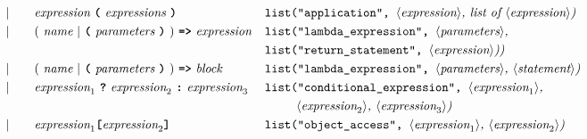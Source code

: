\begin{alignat*}{9}
&&                       && |   &\quad &&   \textit{expression} \ 
                                            \textbf{\texttt{(}}\ \textit{expressions}\
                                            \textbf{\texttt{)}}
                                                           && \texttt{list("application",  } \langle \textit{expression}\rangle \textit{, list of  } \langle \textit{expression}\rangle \textit{)} \\
&&                       && |   &\quad &&   (\ \textit{name}\ | \
                                               \textbf{\texttt{(}}\ \textit{parameters}\ \textbf{\texttt{)}}\
                                            )\    
                                            \texttt{\textbf{=>}}\ \textit{expression}
                                            && \texttt{list("lambda\_expression",  } \langle \textit{parameters}\rangle \textit{,}  \\
                                              && && & && && \texttt{list("return\_statement",  } \langle \textit{expression}\rangle \textit{))} \\
&&                       && |   &\quad &&   (\ \textit{name}\ | \
                                               \textbf{\texttt{(}}\ \textit{parameters}\ \textbf{\texttt{)}}\
                                            )\    
                                            \texttt{\textbf{=>}}\ \textit{block}
                                                           && \texttt{list("lambda\_expression",  } \langle \textit{parameters}\rangle \textit{,  } \langle \textit{statement}\rangle \textit{)} \\
&&                       && |   &\quad &&   \textit{expression}_1 \ \textbf{\texttt{?}}\ 
                                            \textit{expression}_2
                                            \ \textbf{\texttt{:}}\
                                            \textit{expression}_3\
                                                           && \texttt{list("conditional\_expression",  } \langle \textit{expression}_1\rangle \textit{,} \\
                                            &&&&&&&&&\ \ \ \ \ \ \texttt{ } \langle \textit{expression}_2\rangle \textit{,  } \langle \textit{expression}_3\rangle \textit{)} \\
&&                       && |   &\quad && \textit{expression}_1 \textbf{\texttt{[}}
                                          \textit{expression}_2 \textbf{\texttt{]}}
                                                           && \texttt{list("object\_access",  } \langle \textit{expression}_1\rangle \textit{,  } \langle \textit{expression}_2\rangle \textit{)} \\

\end{alignat*}

